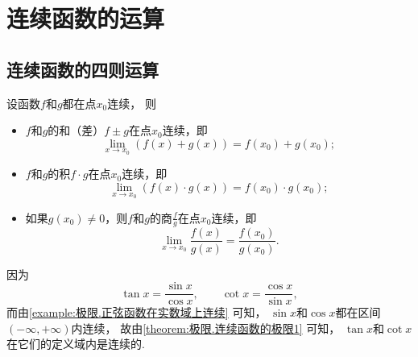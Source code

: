 \section{连续函数的运算}
\subsection{连续函数的四则运算}
\begin{theorem}\label{theorem:极限.连续函数的极限1}
设函数\(f\)和\(g\)都在点\(x_0\)连续，
则\begin{itemize}
	\item \(f\)和\(g\)的和（差）\(f \pm g\)在点\(x_0\)连续，即\begin{equation*}
		\lim_{x \to x_0} (f(x) + g(x))
		= f(x_0) + g(x_0);
	\end{equation*}
	\item \(f\)和\(g\)的积\(f \cdot g\)在点\(x_0\)连续，即\begin{equation*}
		\lim_{x \to x_0} (f(x) \cdot g(x))
		= f(x_0) \cdot g(x_0);
	\end{equation*}
	\item 如果\(g(x_0)\neq0\)，则\(f\)和\(g\)的商\(\frac{f}{g}\)在点\(x_0\)连续，即\begin{equation*}
		\lim_{x \to x_0} \frac{f(x)}{g(x)}
		= \frac{f(x_0)}{g(x_0)}.
	\end{equation*}
\end{itemize}
\end{theorem}

\begin{example}
因为\begin{equation*}
	\tan x=\frac{\sin x}{\cos x}, \qquad
	\cot x=\frac{\cos x}{\sin x},
\end{equation*}
而由\cref{example:极限.正弦函数在实数域上连续} 可知，
\(\sin x\)和\(\cos x\)都在区间\((-\infty,+\infty)\)内连续，
故由\cref{theorem:极限.连续函数的极限1} 可知，
\(\tan x\)和\(\cot x\)在它们的定义域内是连续的.
\end{example}

